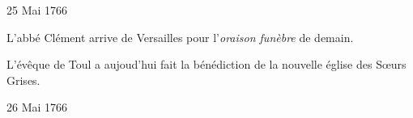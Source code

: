                      \begin{diary}{25 Mai 1766}{}
                        
                        
                           L'abbé Clément arrive de
                              Versailles pour
                           l'\emph{oraison funèbre} de demain. \bigskip
        
        
                        
                           L'évêque de Toul a aujoud'hui
                           fait la bénédiction
                           de la nouvelle église des Sœurs Grises. \bigskip
        
        
                     \end{diary}

                     \begin{diary}{26 Mai 1766}{}
                        

\end{diary}
